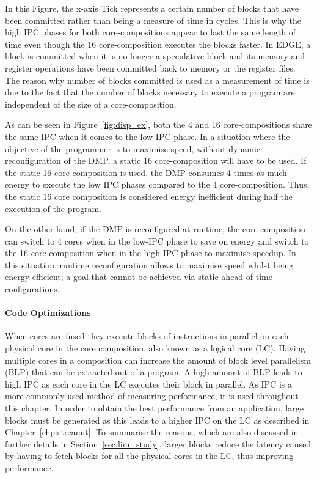 In this Figure, the x-axis Tick represents a certain number of blocks that have been committed rather than being a measure of time in cycles.
This is why the high IPC phases for both core-compositions appear to last the same length of time even though the 16 core-composition executes the blocks faster.
In EDGE, a block is committed when it is no longer a speculative block and its memory and register operations have been committed back to memory or the register files.
The reason why number of blocks committed is used as a measurement of time is due to the fact that the number of blocks necessary to execute a program are independent of the size of a core-composition.

As can be seen in Figure~\ref{fig:disp_ex}, both the 4 and 16 core-compositions share the same IPC when it comes to the low IPC phase.
In a situation where the objective of the programmer is to maximise speed, without dynamic reconfiguration of the DMP, a static 16 core-composition will have to be used.
If the static 16 core composition is used, the DMP consumes 4 times as much energy to execute the low IPC phases compared to the 4 core-composition.
Thus, the static 16 core composition is considered energy inefficient during half the execution of the program.

On the other hand, if the DMP is reconfigured at runtime, the core-composition can switch to 4 cores when in the low-IPC phase to save on energy and switch to the 16 core composition when in the high IPC phase to maximise speedup.
In this situation, runtime reconfiguration allows to maximise speed whilst being energy efficient; a goal that cannot be achieved via static ahead of time configurations.

\paragraph{Code Optimizations}

When cores are fused they execute blocks of instructions in parallel on each physical core in the core composition, also known as a logical core (LC).
Having multiple cores in a composition can increase the amount of block level parallelism (BLP) that can be extracted out of a program.
A high amount of BLP leads to high IPC as each core in the LC executes their block in parallel.
As IPC is a more commonly used method of measuring performance, it is used throughout this chapter.
In order to obtain the best performance from an application, large blocks must be generated as this leads to a higher IPC on the LC as described in Chapter~\ref{chp:streamit}.
To summarise the reasons, which are also discussed in further details in Section~\ref{sec:lim_study}, larger blocks reduce the latency caused by having to fetch blocks for all the physical cores in the LC, thus improving performance.

